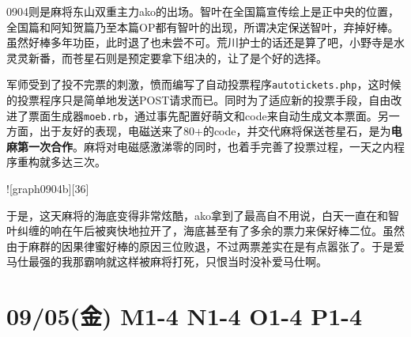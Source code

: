 0904则是麻将东山双重主力ako的出场。智叶在全国篇宣传绘上是正中央的位置，全国篇和阿知贺篇乃至本篇OP都有智叶的出现，所谓决定保送智叶，弃掉好棒。虽然好棒多年功臣，此时退了也未尝不可。荒川护士的话还是算了吧，小野寺是水灵灵新番，而苍星石则是预定要拿下组决的，让了是个好的选择。

军师受到了投不完票的刺激，愤而编写了自动投票程序\verb`autotickets.php`，这时候的投票程序只是简单地发送POST请求而已。同时为了适应新的投票手段，自由改进了票面生成器\verb`moeb.rb`，通过事先配置好萌文和code来自动生成文本票面。另一方面，出于友好的表现，电磁送来了80+的code，并交代麻将保送苍星石，是为\textbf{电麻第一次合作}。麻将对电磁感激涕零的同时，也着手完善了投票过程，一天之内程序重构就多达三次。

![graph0904b][36]

于是，这天麻将的海底变得非常炫酷，ako拿到了最高自不用说，白天一直在和智叶纠缠的响在午后被爽快地拉开了，海底甚至有了多余的票力来保好棒二位。虽然由于麻群的因果律蜜好棒的原因三位败退，不过两票差实在是有点嚣张了。于是爱马仕最强的我那霸响就这样被麻将打死，只恨当时没补爱马仕啊。

\section{09/05(金) M1-4 N1-4 O1-4 P1-4}

